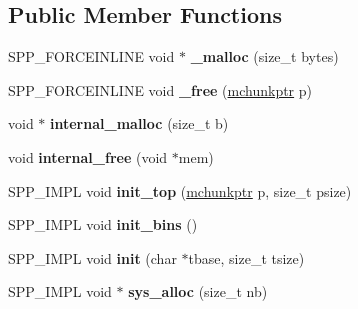 \subsection*{Public Member Functions}
\begin{DoxyCompactItemize}
\item 
S\+P\+P\+\_\+\+F\+O\+R\+C\+E\+I\+N\+L\+I\+NE void $\ast$ {\bfseries \+\_\+malloc} (size\+\_\+t bytes)\hypertarget{classspp_1_1malloc__state_a6c02c6c88aad2a19d9bb685615a27524}{}\label{classspp_1_1malloc__state_a6c02c6c88aad2a19d9bb685615a27524}

\item 
S\+P\+P\+\_\+\+F\+O\+R\+C\+E\+I\+N\+L\+I\+NE void {\bfseries \+\_\+free} (\hyperlink{structspp_1_1malloc__chunk}{mchunkptr} p)\hypertarget{classspp_1_1malloc__state_aa9e5165e8d009073752600249ecdce5a}{}\label{classspp_1_1malloc__state_aa9e5165e8d009073752600249ecdce5a}

\item 
void $\ast$ {\bfseries internal\+\_\+malloc} (size\+\_\+t b)\hypertarget{classspp_1_1malloc__state_af91f59ed2adf8f6b4626a00bcdca402c}{}\label{classspp_1_1malloc__state_af91f59ed2adf8f6b4626a00bcdca402c}

\item 
void {\bfseries internal\+\_\+free} (void $\ast$mem)\hypertarget{classspp_1_1malloc__state_ad04deda57d4c0add1c7066e621da73f7}{}\label{classspp_1_1malloc__state_ad04deda57d4c0add1c7066e621da73f7}

\item 
S\+P\+P\+\_\+\+I\+M\+PL void {\bfseries init\+\_\+top} (\hyperlink{structspp_1_1malloc__chunk}{mchunkptr} p, size\+\_\+t psize)\hypertarget{classspp_1_1malloc__state_af81590f6860e0dd62c518d909e24d058}{}\label{classspp_1_1malloc__state_af81590f6860e0dd62c518d909e24d058}

\item 
S\+P\+P\+\_\+\+I\+M\+PL void {\bfseries init\+\_\+bins} ()\hypertarget{classspp_1_1malloc__state_ac1d851d864191e79f6778e29f4f71d89}{}\label{classspp_1_1malloc__state_ac1d851d864191e79f6778e29f4f71d89}

\item 
S\+P\+P\+\_\+\+I\+M\+PL void {\bfseries init} (char $\ast$tbase, size\+\_\+t tsize)\hypertarget{classspp_1_1malloc__state_a8e8a971951701b53968700ce24dafe45}{}\label{classspp_1_1malloc__state_a8e8a971951701b53968700ce24dafe45}

\item 
S\+P\+P\+\_\+\+I\+M\+PL void $\ast$ {\bfseries sys\+\_\+alloc} (size\+\_\+t nb)\hypertarget{classspp_1_1malloc__state_a439998e8956b1201079f4e2f9e2f1e6d}{}\label{classspp_1_1malloc__state_a439998e8956b1201079f4e2f9e2f1e6d}


\end{DoxyCompactItemize}
